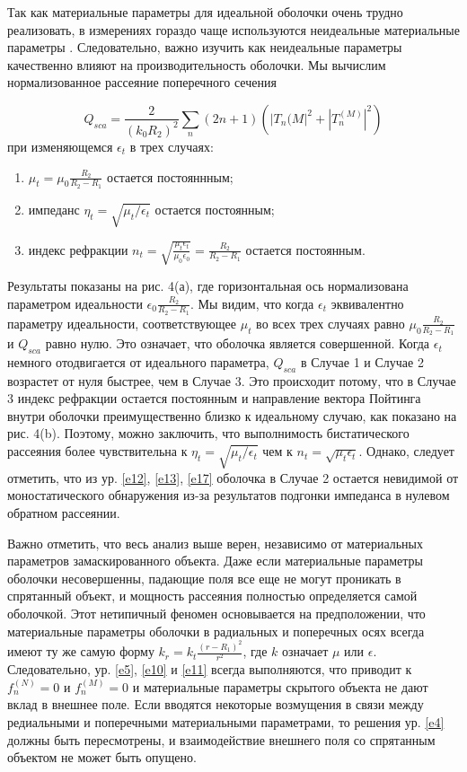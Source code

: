 \documentclass[a4paper, 12pt]{article}
\begin{document}
Так как материальные параметры для идеальной оболочки очень трудно реализовать,
в измерениях гораздо чаще используются неидеальные материальные параметры 
\cite{1,2}. Следовательно, важно изучить как неидеальные параметры качественно
влияют на производительность оболочки. Мы вычислим нормализованное рассеяние
поперечного сечения 

\begin{equation*}
	Q_{sca}=\frac{2}{(k_0R_2)^2}\sum_n(2n+1)(|T_n{(M}|^2+|T_n^{(M)}|^2)
\end{equation*}
при изменяющемся $\epsilon_t$ в трех случаях: 
\begin{enumerate}
	\item $\mu_t=\mu_0 \frac{R_2}{R_2-R_1}$ остается постояннным;
	\item импеданс $\eta_t=\sqrt{\mu_t/\epsilon_t}$ остается постоянным;
	\item индекс рефракции 
	$n_t=\sqrt{\frac{\mu_t\epsilon_t}{\mu_0\epsilon_0}}=\frac{R_2}{R_2-R_1}$
	остается постоянным.
\end{enumerate}

Результаты показаны на рис. 4(а), где горизонтальная
ось нормализована параметром идеальности $\epsilon_0 \frac{R_2}{R_2-R_1}$.
Мы видим, что когда $\epsilon_t$ эквивалентно параметру идеальности,
соответствующее $\mu_t$ во всех трех случаях равно $\mu_0 \frac{R_2}{R_2-R_1}$ и
$Q_{sca}$ равно нулю. 
Это означает, что оболочка является совершенной.
Когда $\epsilon_t$ немного отодвигается от идеального параметра, $Q_{sca}$
в Случае 1 и Случае 2 возрастет от нуля быстрее, чем в Случае 3.
Это происходит потому, что в Случае 3 индекс рефракции остается 
постоянным и направление вектора Пойтинга внутри оболочки преимущественно
близко к идеальному случаю, как показано на рис. 4(b). Поэтому, можно 
заключить, что выполнимость бистатического рассеяния более чувствительна
к $\eta_t=\sqrt{\mu_t/\epsilon_t}$ чем к $n_t=\sqrt{\mu_t\epsilon_t}$.
Однако, следует отметить, что из ур. 
\eqref{e12}, \eqref{e13}, \eqref{e17} оболочка в Случае 2
остается невидимой от моностатического обнаружения из-за
результатов подгонки импеданса в нулевом обратном рассеянии.

Важно отметить, что весь анализ выше верен, независимо от материальных параметров
замаскированного объекта. Даже если материальные параметры оболочки несовершенны,
падающие поля все еще не могут проникать в спрятанный объект, и мощность рассеяния
полностью определяется самой оболочкой. Этот нетипичный феномен основывается на 
предположении, что материальные параметры оболочки в радиальных и поперечных
осях всегда имеют ту же самую форму $k_r=k_t \frac{(r-R_1)^2}{r^2}$, 
где $k$ означает
$\mu$ или $\epsilon$. Следовательно, ур. \eqref{e5}, \eqref{e10} и \eqref{e11}
всегда выполняются, что приводит к $f_n^{(N)}=0$ и $f_n^{(M)}=0$ и материальные
параметры скрытого объекта не дают вклад в внешнее поле. Если вводятся некоторые
возмущения в связи между редиальными и поперечными материальными параметрами, то
решения ур. \eqref{e4} должны быть пересмотрены, и взаимодействие внешнего
поля со спрятанным объектом не может быть опущено.
\end{document}
